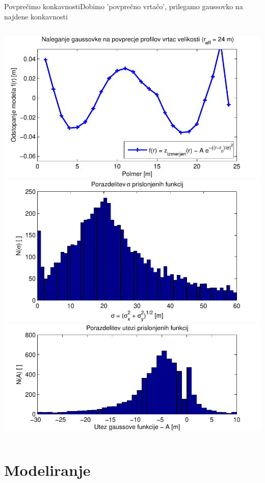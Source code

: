 \documentclass{beamer}
\begin{document}
\begin{frame}{Povprečimo konkavnosti}{Dobimo 'povprečno vrtačo', prilegamo gaussovko na najdene konkavnosti}
\begin{columns}
  \begin{column}{0.45\textwidth}
    \includegraphics[width=\textwidth]{slike/menisija-profil-21-fit} \\
    \includegraphics[width=\textwidth]{slike/menisija-sigme-hist} \\
    \includegraphics[width=\textwidth]{slike/menisija-globine-hist}
  \end{column}
\end{columns}

\end{frame}


\section{Modeliranje}
\end{document}

